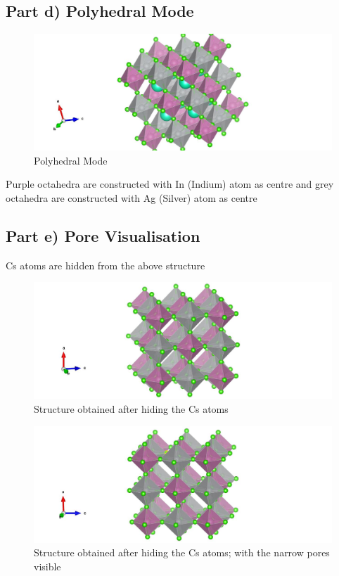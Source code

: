 \documentclass{homework}
\begin{document}
\subsection*{Part d) Polyhedral Mode}
\begin{figure}[ht]
\centering
\includegraphics[width=1\textwidth]{part d) polyhedra.jpg}
\caption{Polyhedral Mode}
\end{figure}
Purple octahedra are constructed with In (Indium) atom as centre and grey octahedra are constructed with Ag (Silver) atom as centre 

\newpage
\subsection*{Part e) Pore Visualisation}
Cs atoms are hidden from the above structure
\begin{figure}[ht]
\centering
\includegraphics[width=1\textwidth]{part e.jpg}
\caption{Structure obtained after hiding the Cs atoms}
\end{figure}
\begin{figure}[ht]
\centering
\includegraphics[width=1\textwidth]{part e backup.jpg}
\caption{Structure obtained after hiding the Cs atoms; with the narrow pores visible}
\end{figure}
\end{document}
